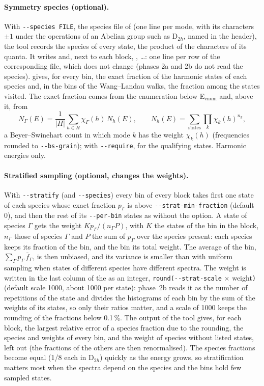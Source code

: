 \paragraph{Symmetry species (optional).} With \texttt{-{}-species FILE},
the species file of  (one line per mode, with its
characters $\pm1$ under the operations of an Abelian group such as
D$_{2h}$, named in the header), the tool records the species of every
state, the product of the characters of its quanta. It writes
 and, next to each block,
, \ldots: one line per row of the
corresponding file, which does not change (phases 2a and 2b do not read
the species).  gives, for every bin, the exact
fraction of the harmonic states of each species and, in the bins of the
Wang--Landau walks, the fraction among the states visited. The exact
fraction comes from the enumeration below E$_\mathrm{enum}$ and, above it,
from
\[
N_\Gamma(E) = \frac{1}{|H|}\sum_{h\in H}\chi_\Gamma(h)\,N_h(E),\qquad
N_h(E)=\sum_{\text{states}}\prod_k \chi_k(h)^{n_k},
\]
a Beyer--Swinehart count in which mode $k$ has the weight $\chi_k(h)$
(frequencies rounded to \texttt{-{}-bs-grain}); with
\texttt{-{}-require}, for the qualifying states. Harmonic energies only.

\paragraph{Stratified sampling (optional, changes the weights).} With
\texttt{-{}-stratify} (and \texttt{-{}-species}) every bin of every block
takes first one state of each species whose exact fraction $p_\Gamma$ is
above \texttt{-{}-strat-min-fraction} (default 0), and then the rest of
its \texttt{-{}-per-bin} states as without the option. A state of
species $\Gamma$ gets the weight $K p_\Gamma/(n_\Gamma P)$, with $K$ the
states of the bin in the block, $n_\Gamma$ those of species $\Gamma$ and
$P$ the sum of $p_\Gamma$ over the species present: each species keeps its
fraction of the bin, and the bin its total weight. The average of the bin,
$\sum_\Gamma p_\Gamma\,\bar f_\Gamma$, is then unbiased, and its variance
is smaller than with uniform sampling when states of different species
have different spectra. The weight is written in the last column of the
 as an integer, \texttt{round(-{}-strat-scale} $\times$
weight\texttt{)} (default scale 1000, about 1000 per state): phase~2b
reads it as the number of repetitions of the state and divides the
histograms of each bin by the sum of the weights of its states, so only
their ratios matter, and a scale of 1000 keeps the rounding of the
fractions below 0.1\,\%. The output of the tool gives, for each block, the
largest relative error of a species fraction due to the rounding, the
species and weights of every bin, and the weight of species without
listed states, left out (the fractions of the others are then
renormalised). The species fractions become equal (1/8 each in D$_{2h}$)
quickly as the energy grows, so stratification matters most when the
spectra depend on the species and the bins hold few sampled states.

